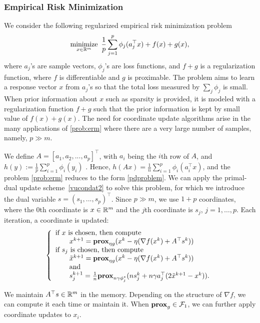 \subsubsection{Empirical Risk Minimization}
We consider the following regularized empirical risk minimization problem
\begin{equation}\label{prob:erm}
\Min_{x\in\RR^m}~ \frac{1}{p}\sum_{j=1}^p\phi_j(a_j^\top x)+f(x)+g(x),
\end{equation}
where $a_j$'s are sample vectors, $\phi_j$'s are loss functions, and $f+g$ is a regularization function, where $f$ is differentiable and $g$ is proximable. The problem aims to learn a response vector $x$ from $a_j$'s so that the total loss measured by $\sum_j \phi_j$ is small. When prior information about $x$ such as sparsity is provided, it is modeled with a regularization function $f+g$ such that the prior information is kept by small value of $f(x)+g(x)$. The need for coordinate update algorithms arise in  the many applications of \eqref{prob:erm} where there are a very large number of samples, namely, $p\gg m$. 

We define $A=[a_1,a_2,...,a_p]^\top$, with $a_i$ being the $i$th row of $A$, and $h(y):=\frac{1}{p}\sum_{i=1}^p\phi_i(y_i)$ . Hence, $h(Ax)=\frac{1}{n}\sum_{i=1}^p\phi_i(a_i^\top x)$, and the problem \eqref{prob:erm} reduces to the form \eqref{pdproblem}.
We can apply the primal-dual update scheme~\eqref{vucondat2} to solve this problem, for which we introduce the dual variable $s = (s_1, ..., s_p)^\top$. Since $p\gg m$, we use $1+p$ coordinates, where the $0$th coordinate is $x\in\mathbb{R}^m$ and the $j$th coordinate is $s_j$, $j=1,\ldots,p$.  Each iteration, a coordinate is updated:
\begin{equation}
{\left\{
\begin{array}{l}
\text{if }x\text{ is chosen, then compute}\\
\qquad {x}^{k+1}=\prox_{\eta g}(x^k-\eta(\nabla f(x^k)+A^\top s^k))\\
\text{if }s_j\text{ is chosen, then compute}\\
\qquad\tilde{x}^{k+1}=\prox_{\eta g}(x^k-\eta(\nabla f(x^k)+A^\top s^k))\\
\qquad\text{and}\\
\qquad{s}_j^{k+1}=\frac{1}{n}\prox_{n\gamma \phi_j^*} (ns_j^k+n\gamma a_j^\top(2\tilde{x}^{k+1}-x^k)).
\end{array}
\right.
}\end{equation}

We maintain $A^\top s\in \mathbb{R}^m$ in the memory. Depending on the structure of $\nabla f$, we can compute it each time or maintain it. When $\mathbf{prox}_g\in{\mathcal{F}}_1$, we can further apply  coordinate updates to $x_i$. 
